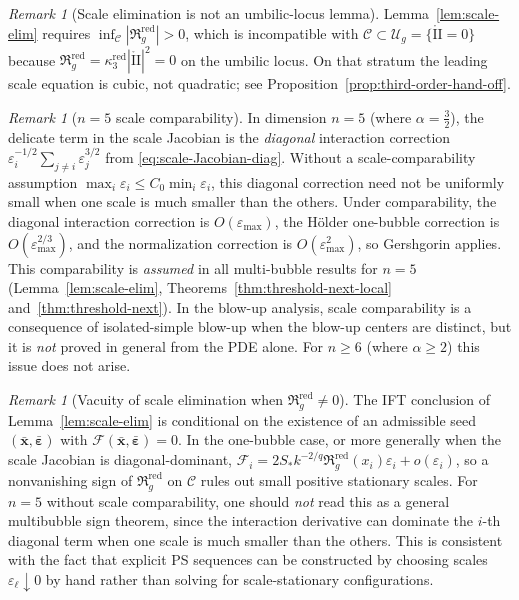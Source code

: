 \documentclass[11pt,reqno,a4paper]{amsart}
\numberwithin{equation}{section}
\theoremstyle{plain}
\theoremstyle{remark}
\newtheorem{remark}[theorem]{Remark}
\theoremstyle{plain}
\begin{document}
\begin{remark}[Scale elimination is not an umbilic-locus lemma]
\label{rem:scale-elim-not-umbilic}
Lemma~\ref{lem:scale-elim} requires
$\inf_{\mathcal C}|\mathfrak R_g^{\mathrm{red}}|>0$, which is
incompatible with $\mathcal C\subset\mathcal U_g=\{\mathring{\mathrm{II}}=0\}$
because $\mathfrak R_g^{\mathrm{red}}=\kappa_3^{\mathrm{red}}|\mathring{\mathrm{II}}|^2=0$
on the umbilic locus.  On that stratum the leading scale equation is cubic,
not quadratic; see Proposition~\ref{prop:third-order-hand-off}.
\end{remark}

\begin{remark}[$n=5$ scale comparability]\label{rem:n5-comparability}
In dimension $n=5$ (where $\alpha=\frac{3}{2}$), the delicate term in the scale Jacobian is the
\emph{diagonal} interaction correction
$\varepsilon_i^{-1/2}\sum_{j\neq i}\varepsilon_j^{3/2}$ from \eqref{eq:scale-Jacobian-diag}.
Without a scale-comparability assumption $\max_i\varepsilon_i\le C_0\min_i\varepsilon_i$,
this diagonal correction need not be uniformly small when one scale is much smaller than the others.
Under comparability, the diagonal interaction correction is $O(\varepsilon_{\max})$, the
H\"older one-bubble correction is $O(\varepsilon_{\max}^{2/3})$,
and the normalization correction is $O(\varepsilon_{\max}^2)$, so Gershgorin applies.
This comparability is \emph{assumed} in all multi-bubble results for $n=5$
(Lemma~\ref{lem:scale-elim}, Theorems~\ref{thm:threshold-next-local} and~\ref{thm:threshold-next}).
In the blow-up analysis, scale comparability is a consequence of isolated-simple blow-up
when the blow-up centers are distinct, but it is \emph{not} proved in general from the PDE alone.
For $n\ge6$ (where $\alpha\ge2$) this issue does not arise.
\end{remark}

\begin{remark}[Vacuity of scale elimination when $\mathfrak R_g^{\mathrm{red}}\neq0$]\label{rem:scale-elim-vacuity}
The IFT conclusion of Lemma~\ref{lem:scale-elim} is conditional on the existence of an admissible
seed $(\bar{\mathbf x},\bar{\boldsymbol\varepsilon})$ with $\mathcal F(\bar{\mathbf x},\bar{\boldsymbol\varepsilon})=0$.
In the one-bubble case, or more generally when the scale Jacobian is diagonal-dominant,
$\mathcal F_i=2S_\ast k^{-2/q}\mathfrak R_g^{\mathrm{red}}(x_i)\varepsilon_i+o(\varepsilon_i)$,
so a nonvanishing sign of $\mathfrak R_g^{\mathrm{red}}$ on $\mathcal C$ rules out small positive stationary scales.
For $n=5$ without scale comparability, one should \emph{not} read this as a general multibubble sign theorem,
since the interaction derivative can dominate the $i$-th diagonal term when one scale is much smaller than the others.
This is consistent with the fact that explicit PS sequences can be constructed by choosing scales $\varepsilon_\ell\downarrow0$ by hand
rather than solving for scale-stationary configurations.
\end{remark}
\end{document}
